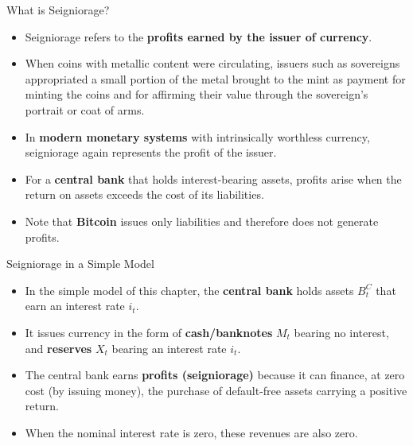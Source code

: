 \documentclass[11pt,aspectratio=169]{beamer}
\begin{document}
\begin{frame}{What is Seigniorage?}

\begin{itemize}
    \item Seigniorage refers to the \textbf{profits earned by the issuer of currency}.
    \vspace{0.6em}

    \item When coins with metallic content were circulating, issuers such as sovereigns appropriated a small portion of the metal brought to the mint as payment for minting the coins and for affirming their value through the sovereign’s portrait or coat of arms.
    \vspace{0.6em}

    \item In \textbf{modern monetary systems} with intrinsically worthless currency, seigniorage again represents the profit of the issuer.
    \vspace{0.6em}

    \item For a \textbf{central bank} that holds interest-bearing assets, profits arise when the return on assets exceeds the cost of its liabilities.
    \vspace{0.6em}

    \item Note that \textbf{Bitcoin} issues only liabilities and therefore does not generate profits.
\end{itemize}

\end{frame}
\begin{frame}{Seigniorage in a Simple Model}

\begin{itemize}
    \item In the simple model of this chapter, the \textbf{central bank} holds assets $B_t^C$ that earn an interest rate $i_t$.
    \vspace{0.6em}

    \item It issues currency in the form of \textbf{cash/banknotes} $M_t$ bearing no interest, and \textbf{reserves} $X_t$ bearing an interest rate $i_t$.
    \vspace{0.6em}

    \item The central bank earns \textbf{profits (seigniorage)} because it can finance, at zero cost (by issuing money), the purchase of default-free assets carrying a positive return.
    \vspace{0.6em}

    \item When the nominal interest rate is zero, these revenues are also zero.
\end{itemize}

\end{frame}
\end{document}
